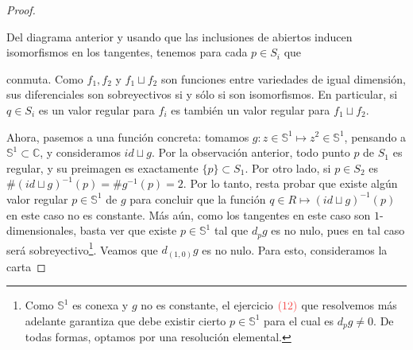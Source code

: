 \documentclass[11pt]{article}
\newcommand{\C}{\mathbb{C}}
\newcommand{\Ss}{\mathbb{S}}
\newcommand{\paint}[2]{\color{#1}{#2}}
\newcommand*{\isoarrow}[1]{\arrow[#1,"\rotatebox{90}{\LARGE{\(\sim\)}}"
]}
\begin{document}
\begin{proof}
\begin{center}
\end{center}
Del diagrama anterior y usando que las inclusiones de abiertos inducen isomorfismos en los tangentes, tenemos para cada $p \in S_i$ que
\begin{center}
\end{center}
conmuta. Como $f_1,f_2$ y $f_1 \sqcup f_2$ son funciones entre variedades de igual dimensi\'on, sus diferenciales son sobreyectivos si y s\'olo si son isomorfismos. En particular, si $q \in S_i$ es un valor regular para $f_i$ es tambi\'en un valor regular para $f_1 \sqcup f_2$.

Ahora, pasemos a una funci\'on concreta: tomamos $g : z \in \Ss^1 \mapsto z^2 \in \Ss^1$, pensando a $\Ss^1 \subset \C$, y consideramos $id \sqcup g$. Por la observaci\'on anterior, todo punto $p$ de $S_1$ es regular, y su preimagen es exactamente $\{p\} \subset S_1$. Por otro lado, si $p \in S_2$ es $\#(id \sqcup g )^{-1}(p) = \#g^{-1}(p) = 2$. Por lo tanto, resta probar que existe alg\'un valor regular $p \in \Ss^1$ de $g$ para concluir que la funci\'on $q \in R \mapsto (id \sqcup g)^{-1}(p)$ en este caso no es constante. M\'as a\'un, como los tangentes en este caso son $1$-dimensionales, basta ver que existe $p \in \Ss^1$ tal que $d_pg$ es no nulo, pues en tal caso ser\'a sobreyectivo\footnote{Como $\Ss^1$ es conexa y $g$ no es constante, el ejercicio $\paint{red}{(12)}$ que resolvemos m\'as adelante garantiza que debe existir cierto $p \in \Ss^1$ para el cual es $d_pg \neq 0$. De todas formas, optamos por una resoluci\'on elemental.}. Veamos que $d_{(1,0)}g$ es no nulo. Para esto, consideramos la carta


\end{proof}
\end{document}
